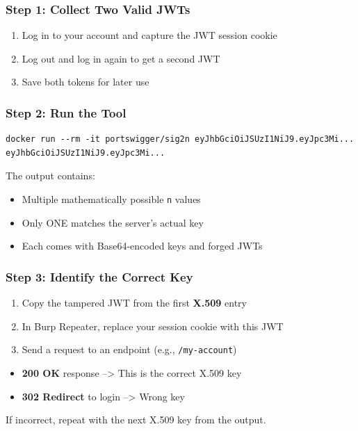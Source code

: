 \documentclass{article}
\begin{document}
\subsubsection{Step 1: Collect Two Valid JWTs}

\begin{enumerate}
    \item Log in to your account and capture the JWT session cookie
    \item Log out and log in again to get a second JWT
    \item Save both tokens for later use
\end{enumerate}

\subsubsection{Step 2: Run the Tool}

\begin{lstlisting}[caption=Example Command]
docker run --rm -it portswigger/sig2n eyJhbGciOiJSUzI1NiJ9.eyJpc3Mi... eyJhbGciOiJSUzI1NiJ9.eyJpc3Mi...
\end{lstlisting}

The output contains:
\begin{itemize}
    \item Multiple mathematically possible \texttt{n} values
    \item Only ONE matches the server's actual key
    \item Each comes with Base64-encoded keys and forged JWTs
\end{itemize}

\subsubsection{Step 3: Identify the Correct Key}

\begin{enumerate}
    \item Copy the tampered JWT from the first \textbf{X.509} entry
    \item In Burp Repeater, replace your session cookie with this JWT
    \item Send a request to an endpoint (e.g., \texttt{/my-account})
\end{enumerate}

\begin{attackbox}
\begin{itemize}
    \item \textbf{200 OK} response --> This is the correct X.509 key 
    \item \textbf{302 Redirect} to login --> Wrong key 
\end{itemize}
If incorrect, repeat with the next X.509 key from the output.
\end{attackbox}
\end{document}
